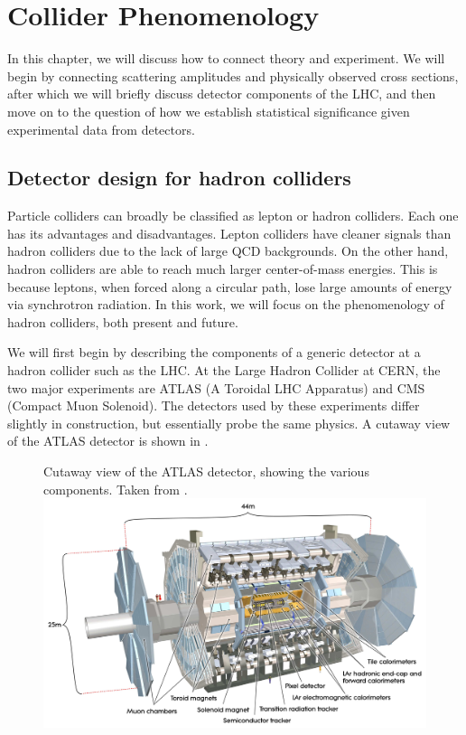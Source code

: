 \chapter{Collider Phenomenology}
In this chapter, we will discuss how to connect theory and experiment. We will begin by connecting scattering amplitudes and physically observed cross sections, after which we will briefly discuss detector components of the LHC, and then move on to the question of how we establish statistical significance given experimental data from detectors.
\section{Detector design for hadron colliders}
Particle colliders can broadly be classified as lepton or hadron colliders. Each one has its advantages and disadvantages. Lepton colliders have cleaner signals than hadron colliders due to the lack of large QCD backgrounds. On the other hand, hadron colliders are able to reach much larger center-of-mass energies. This is because leptons, when forced along a circular path, lose large amounts of energy via synchrotron radiation. In this work, we will focus on the phenomenology of hadron colliders, both present and future.

We will first begin by describing the components of a generic detector at a hadron collider such as the LHC. At the Large Hadron Collider at CERN, the two major experiments are ATLAS (A Toroidal LHC Apparatus) and CMS (Compact Muon Solenoid). The detectors used by these experiments differ slightly in construction, but essentially probe the same physics. A cutaway view of the ATLAS detector is shown in \label{fig:ATLAS_cutaway}.

\begin{figure}[h]
  \begin{sidecaption}
    { Cutaway view of the ATLAS detector, showing the various components. Taken from \citep{Atlas2008}.}
    \centering
  \includegraphics[trim = {2cm 5cm 2cm 2cm}, clip, width=1\textwidth]{images/atlas}
  \end{sidecaption}
  \label{fig:ATLAS_cutaway}
\end{figure}

